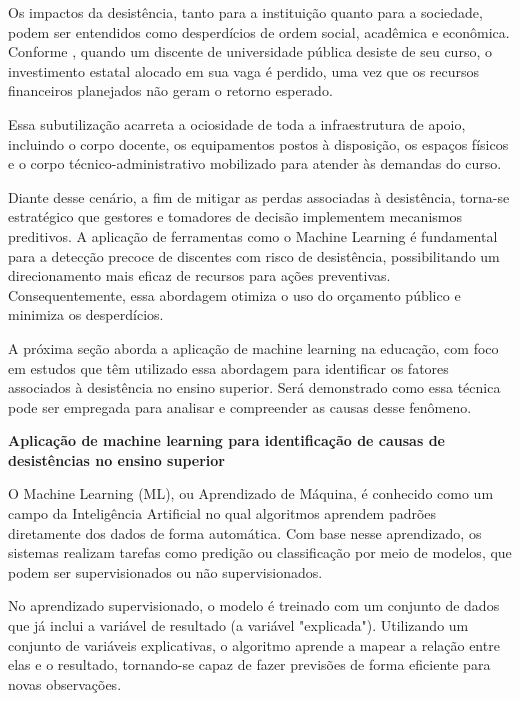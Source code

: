 Os impactos da desistência, tanto para a instituição quanto para a sociedade, podem ser entendidos como desperdícios de ordem social, acadêmica e econômica. Conforme , quando um discente de universidade pública desiste de seu curso, o investimento estatal alocado em sua vaga é perdido, uma vez que os recursos financeiros planejados não geram o retorno esperado.

Essa subutilização acarreta a ociosidade de toda a infraestrutura de apoio, incluindo o corpo docente, os equipamentos postos à disposição, os espaços físicos e o corpo técnico-administrativo mobilizado para atender às demandas do curso.

Diante desse cenário, a fim de mitigar as perdas associadas à desistência, torna-se estratégico que gestores e tomadores de decisão implementem mecanismos preditivos. A aplicação de ferramentas como o Machine Learning é fundamental para a detecção precoce de discentes com risco de desistência, possibilitando um direcionamento mais eficaz de recursos para ações preventivas. Consequentemente, essa abordagem otimiza o uso do orçamento público e minimiza os desperdícios.

A próxima seção aborda a aplicação de machine learning na educação, com foco em estudos que têm utilizado essa abordagem para identificar os fatores associados à desistência no ensino superior. Será demonstrado como essa técnica pode ser empregada para analisar e compreender as causas desse fenômeno.

\vspace{1.5em}
\noindent\textbf{\themanualsection\hspace{1em}Aplicação de machine learning para identificação de causas de desistências no ensino superior}
\vspace{0.5em}
\par

O Machine Learning (ML), ou Aprendizado de Máquina, é conhecido como um campo da Inteligência Artificial no qual algoritmos aprendem padrões diretamente dos dados de forma automática. Com base nesse aprendizado, os sistemas realizam tarefas como predição ou classificação por meio de modelos, que podem ser supervisionados ou não supervisionados.

No aprendizado supervisionado, o modelo é treinado com um conjunto de dados que já inclui a variável de resultado (a variável "explicada"). Utilizando um conjunto de variáveis explicativas, o algoritmo aprende a mapear a relação entre elas e o resultado, tornando-se capaz de fazer previsões de forma eficiente para novas observações.

